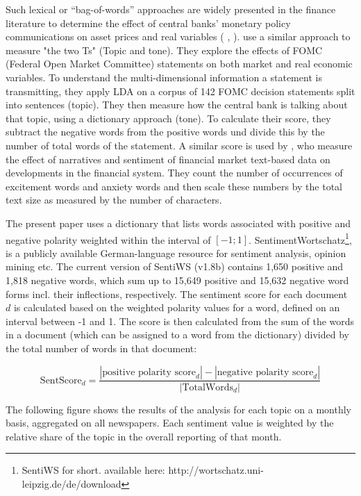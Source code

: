 \documentclass[12pt,a4paper,notitlepage]{article}
\begin{document}
Such lexical or “bag-of-words” approaches are widely presented in the finance literature to  determine  the  effect  of  central  banks’  monetary  policy  communications on asset prices and real variables (\citet{nyman_news_2018} \citep{tetlock_giving_2007}, \citep{tetlock_more_2008}). \citet{hansen_shocking_2016} use a similar approach to measure "the two Ts" (Topic and tone). They explore the effects of FOMC (Federal Open Market Committee) statements on both market and real economic variables. To understand the multi-dimensional information a statement is transmitting, they apply LDA on a corpus of 142 FOMC decision statements split into sentences (topic). They then measure how the central bank is talking about that topic, using a dictionary approach (tone). To calculate their score, they subtract the negative words from the positive words und divide this by the number of total words of the statement. A similar score is used by \citet{nyman_news_2018}, who measure the effect of narratives and sentiment of financial market text-based data on developments in the financial system. They count the number of occurrences of excitement words and anxiety words and then scale these numbers by the total text size as measured by the number of characters.

The present paper uses a dictionary that lists words associated with positive and negative polarity weighted within the interval of $[-1; 1]$. SentimentWortschatz\footnote{SentiWS for short. available here: http://wortschatz.uni-leipzig.de/de/download}, is a publicly available German-language resource for sentiment analysis, opinion mining etc. The current version of SentiWS (v1.8b) contains 1,650 positive and 1,818 negative words, which sum up to 15,649 positive and 15,632 negative word forms incl. their inflections, respectively. The sentiment score for each document $d$ is calculated  based on the weighted polarity values for a word, defined on an interval between -1 and 1. The score is then calculated from the sum of the words in a document (which can be assigned to a word from the dictionary) divided by the total number of words in that document:
 
\begin{equation}
	\text{SentScore}_d = \frac{|\text{positive polarity score}_d| - |\text{negative polarity score}_d|}{|\text{TotalWords}_d|}
\end{equation}

The following figure shows the results of the analysis for each topic on a monthly basis, aggregated on all newspapers. Each sentiment value is weighted by the relative share of the topic in the overall reporting of that month.
\end{document}
